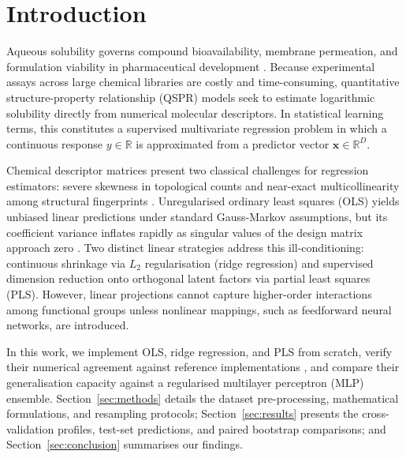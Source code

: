 \documentclass[conference]{IEEEtran}
\begin{document}
\section{Introduction}
\label{sec:intro}

Aqueous solubility governs compound bioavailability, membrane permeation, and formulation viability in pharmaceutical development \cite{kuhn2013}. Because experimental assays across large chemical libraries are costly and time-consuming, quantitative structure-property relationship (QSPR) models seek to estimate logarithmic solubility directly from numerical molecular descriptors. In statistical learning terms, this constitutes a supervised multivariate regression problem in which a continuous response $y \in \mathbb{R}$ is approximated from a predictor vector $\mathbf{x} \in \mathbb{R}^{D}$.

Chemical descriptor matrices present two classical challenges for regression estimators: severe skewness in topological counts and near-exact multicollinearity among structural fingerprints \cite{hastie2009}. Unregularised ordinary least squares (OLS) yields unbiased linear predictions under standard Gauss-Markov assumptions, but its coefficient variance inflates rapidly as singular values of the design matrix approach zero \cite{golub2013}. Two distinct linear strategies address this ill-conditioning: continuous shrinkage via $L_2$ regularisation (ridge regression) \cite{hoerl1970} and supervised dimension reduction onto orthogonal latent factors via partial least squares (PLS). However, linear projections cannot capture higher-order interactions among functional groups unless nonlinear mappings, such as feedforward neural networks, are introduced.

In this work, we implement OLS, ridge regression, and PLS from scratch, verify their numerical agreement against reference implementations \cite{pedregosa2011}, and compare their generalisation capacity against a regularised multilayer perceptron (MLP) ensemble. Section~\ref{sec:methods} details the dataset pre-processing, mathematical formulations, and resampling protocols; Section~\ref{sec:results} presents the cross-validation profiles, test-set predictions, and paired bootstrap comparisons; and Section~\ref{sec:conclusion} summarises our findings.

\end{document}
